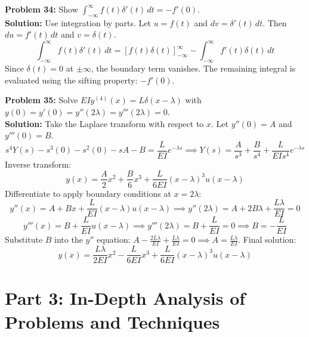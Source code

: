 \documentclass[11pt, letterpaper]{article}
\theoremstyle{definition}
\theoremstyle{remark}
\begin{document}
\textbf{Problem 34:} Show $\int_{-\infty}^{\infty} f(t)\delta'(t) \, dt = -f'(0)$.
\\[4pt]
\textbf{Solution:} Use integration by parts. Let $u = f(t)$ and $dv = \delta'(t) \, dt$. Then $du = f'(t) \, dt$ and $v = \delta(t)$.
\[ \int_{-\infty}^{\infty} f(t)\delta'(t) \, dt = \left[ f(t)\delta(t) \right]_{-\infty}^{\infty} - \int_{-\infty}^{\infty} f'(t)\delta(t) \, dt \]
Since $\delta(t) = 0$ at $\pm \infty$, the boundary term vanishes. The remaining integral is evaluated using the sifting property: $-f'(0)$.

\textbf{Problem 35:} Solve $EI y^{(4)}(x) = L\delta(x - \lambda)$ with $y(0) = y'(0) = y''(2\lambda) = y'''(2\lambda) = 0$.
\\[4pt]
\textbf{Solution:} Take the Laplace transform with respect to $x$. Let $y''(0) = A$ and $y'''(0) = B$.
\[ s^4 Y(s) - s^3(0) - s^2(0) - sA - B = \frac{L}{EI}e^{-\lambda s} \implies Y(s) = \frac{A}{s^3} + \frac{B}{s^4} + \frac{L}{EI s^4}e^{-\lambda s} \]
Inverse transform:
\[ y(x) = \frac{A}{2}x^2 + \frac{B}{6}x^3 + \frac{L}{6EI}(x - \lambda)^3 u(x - \lambda) \]
Differentiate to apply boundary conditions at $x = 2\lambda$:
\[ y''(x) = A + Bx + \frac{L}{EI}(x - \lambda)u(x - \lambda) \implies y''(2\lambda) = A + 2B\lambda + \frac{L\lambda}{EI} = 0 \]
\[ y'''(x) = B + \frac{L}{EI}u(x - \lambda) \implies y'''(2\lambda) = B + \frac{L}{EI} = 0 \implies B = -\frac{L}{EI} \]
Substitute $B$ into the $y''$ equation: $A - \frac{2L\lambda}{EI} + \frac{L\lambda}{EI} = 0 \implies A = \frac{L\lambda}{EI}$.
Final solution:
\[ y(x) = \frac{L\lambda}{2EI}x^2 - \frac{L}{6EI}x^3 + \frac{L}{6EI}(x - \lambda)^3 u(x - \lambda) \]

\newpage
\section{Part 3: In-Depth Analysis of Problems and Techniques}
\end{document}

